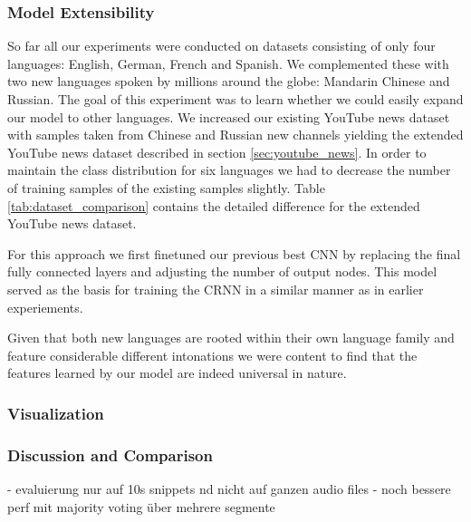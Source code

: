 \subsubsection{Model Extensibility} 
\label{sec:extensibility}
So far all our experiments were conducted on datasets consisting of only four languages: English, German, French and Spanish. We complemented these with two new languages spoken by millions around the globe: Mandarin Chinese and Russian. The goal of this experiment was to learn whether we could easily expand our model to other languages. 
We increased our existing YouTube news dataset with samples taken from Chinese and Russian new channels yielding the extended YouTube news dataset described in section \ref{sec:youtube_news}. In order to maintain the class distribution for six languages we had to decrease the number of training samples of the existing samples slightly. Table \ref{tab:dataset_comparison} contains the detailed difference for the extended YouTube news dataset.

For this approach we first finetuned our previous best CNN by replacing the final fully connected layers and adjusting the number of output nodes. This model served as the basis for training the CRNN in a similar manner as in earlier experiements.

Given that both new languages are rooted within their own language family and feature considerable different intonations we were content to find that the features learned by our model are indeed universal in nature. 

\subsubsection{Visualization} 
\label{sec:visualization}

\subsubsection{Discussion and Comparison} 
\label{sec:comparison}

- evaluierung nur auf 10s snippets nd nicht auf ganzen audio files
- noch bessere perf mit majority voting über mehrere segmente
